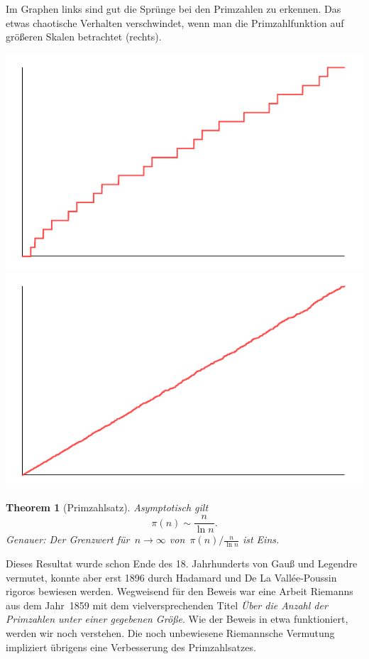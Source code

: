 \documentclass[twoside]{../zirkelblatt1415}
\theoremstyle{definition}
\theoremstyle{plain}
\newtheorem{thm}[defn]{Theorem}
\theoremstyle{remark}
\begin{document}
Im Graphen links sind gut die Sprünge bei den Primzahlen zu erkennen. Das etwas
chaotische Verhalten verschwindet, wenn man die Primzahlfunktion auf größeren
Skalen betrachtet (rechts).

\begin{center}
  \includegraphics[scale=0.5]{pi-function-1}\qquad\qquad
  \includegraphics[scale=0.5]{pi-function-2}
\end{center}

\begin{thm}[Primzahlsatz]\label{thm:primzahlsatz}
Asymptotisch gilt
\[ \pi(n) \sim \frac{n}{\ln n}. \]
Genauer: Der Grenzwert für~$n \to \infty$ von~$\pi(n) / \frac{n}{\ln n}$ ist
Eins.
\end{thm}

Dieses Resultat wurde schon Ende des 18. Jahrhunderts von Gauß und Legendre
vermutet, konnte aber erst 1896 durch Hadamard und De La Vallée-Poussin rigoros
bewiesen werden. Wegweisend für den Beweis war eine Arbeit Riemanns aus dem
Jahr~1859 mit dem vielversprechenden Titel \emph{Über die Anzahl der Primzahlen
unter einer gegebenen Größe}. Wie der Beweis in etwa funktioniert, werden wir
noch verstehen. Die noch unbewiesene Riemannsche Vermutung impliziert übrigens
eine Verbesserung des Primzahlsatzes.
\end{document}
